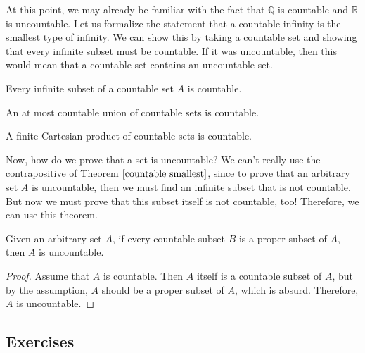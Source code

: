 \documentclass{article}
\begin{document}
    At this point, we may already be familiar with the fact that $\mathbb{Q}$ is countable and $\mathbb{R}$ is uncountable. Let us formalize the statement that a countable infinity is the smallest type of infinity. We can show this by taking a countable set and showing that every infinite subset must be countable. If it was uncountable, then this would mean that a countable set contains an uncountable set. 

    \begin{theorem}
      \label{countable smallest}
      Every infinite subset of a countable set $A$ is countable. 
    \end{theorem}

    \begin{theorem}
      An at most countable union of countable sets is countable. 
    \end{theorem}

    \begin{theorem}
      A finite Cartesian product of countable sets is countable. 
    \end{theorem}

    Now, how do we prove that a set is uncountable? We can't really use the contrapositive of Theorem $\ref{countable smallest}$, since to prove that an arbitrary set $A$ is uncountable, then we must find an infinite subset that is not countable. But now we must prove that this subset itself is not countable, too! Therefore, we can use this theorem. 

    \begin{theorem}
      Given an arbitrary set $A$, if every countable subset $B$ is a proper subset of $A$, then $A$ is uncountable. 
    \end{theorem}
    \begin{proof}
      Assume that $A$ is countable. Then $A$ itself is a countable subset of $A$, but by the assumption, $A$ should be a proper subset of $A$, which is absurd. Therefore, $A$ is uncountable. 
    \end{proof}

  \subsection{Exercises}

    \begin{exercise}
      
    \end{exercise}
\end{document}
